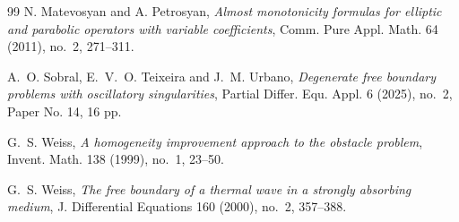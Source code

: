 \documentclass[reqno,11pt]{amsart}
\newcommand{\1}{\mathds{1}}  %
\numberwithin{equation}{section}
\begin{document}
\begin{thebibliography}{99}
 N. Matevosyan and A. Petrosyan, 
\textit{Almost monotonicity formulas for elliptic and parabolic operators with variable coefficients}, 
Comm. Pure Appl. Math. 64 (2011), no.~2, 271--311.

 A.~O. Sobral, E.~V.~O. Teixeira and J.~M. Urbano, 
\textit{Degenerate free boundary problems with oscillatory singularities}, Partial Differ. Equ. Appl. 6 (2025), no.~2, Paper No. 14, 16 pp.

 G.~S. Weiss, 
\textit{A homogeneity improvement approach to the obstacle problem}, 
Invent. Math. 138 (1999), no.~1, 23--50.

 G.~S. Weiss, 
\textit{The free boundary of a thermal wave in a strongly absorbing medium}, 
J. Differential Equations 160 (2000), no.~2, 357--388.

\end{thebibliography}
\end{document}
